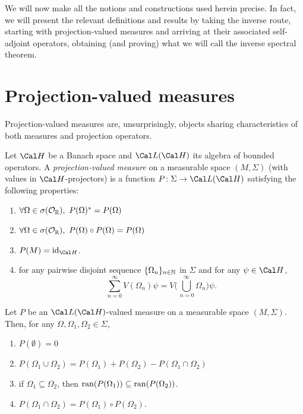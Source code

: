 We will now make all the notions and constructions used herein precise. In fact, we will present the relevant definitions and results by taking the inverse route, starting with projection-valued measures and arriving at their associated self-adjoint operators, obtaining (and proving) what we will call the inverse spectral theorem.

\section{Projection-valued measures}

Projection-valued measures are, unsurprisingly, objects sharing
characteristics of both measures and projection operators.

\begin{definition}
  Let \(\Cal H\) be a Banach space and \(\Cal L(\Cal H)\) its algebra
  of bounded operators.
  A \emph{projection-valued measure}
  on a measurable space \((M,\Sigma)\)
  (with values in \(\Cal H\)-projectors)
  is a function \(P\colon\Sigma\to\Cal L(\Cal H)\) satisfying
  the following properties:
  \begin{enumerate}[label=(\roman*)]
    \item
      $\forall \Omega \in \sigma(\mathcal{O}_{\mathbb{R}}), \
      P(\Omega)^* = P(\Omega) $
    \item
      $\forall \Omega \in \sigma(\mathcal{O}_{\mathbb{R}}), \
      P(\Omega)\circ P(\Omega) = P(\Omega) $
    \item \(P(M)=\id_{\Cal H}\).
    \item
      for any pairwise disjoint sequence
      $\{\Omega_n\}_{n\in\mathbb{N}}$ in $\Sigma$
      and for any \(\psi\in\Cal H\),
      \begin{equation*}
        \sum_{n=0}^{\infty}V(\Omega_n)\psi
        =
        V\Big(\bigcup_{\, n=0}^{\infty}\Omega_n\Big)\psi.
      \end{equation*}
  \end{enumerate}
\end{definition}

\begin{lemma}
  Let $P$ be an \(\Cal L(\Cal H)\)-valued
  measure on a measurable space \((M,\Sigma)\).
  Then, for any $\Omega,\Omega_1,\Omega_2\in\Sigma$,
  \begin{enumerate}[label=(\roman*)]
    \item
      \(P(\emptyset)=0\)
    \item
      $P(\Omega_1\cup\Omega_2)
      =P(\Omega_1)+P(\Omega_2)-P(\Omega_1\cap\Omega_2)$
    \item
      if $\Omega_1\subseteq\Omega_2$,
      then $\operatorname{ran}(P(\Omega_1))\subseteq \operatorname{ran}(P(\Omega_2))$.
    \item \(P(\Omega_1\cap\Omega_2)=P(\Omega_1)\circ P(\Omega_2)\).
  \end{enumerate}
\end{lemma}

